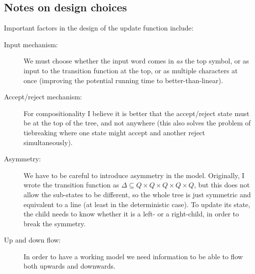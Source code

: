 \documentclass{article}
\theoremstyle{definition}
\begin{document}
\subsection{Notes on design choices}

Important factors in the design of the update function include:

\begin{description}
\item[Input mechanism:]
We must choose whether the input word comes in \emph{as} the top symbol, or as input to the transition function at the top, or as multiple characters at once (improving the potential running time to better-than-linear).

\item[Accept/reject mechanism:]
For compositionality I believe it is better that the accept/reject state must be at the top of the tree, and not anywhere (this also solves the problem of tiebreaking where one state might accept and another reject simultaneously).

\item[Asymmetry:]
We have to be careful to introduce asymmetry in the model.
Originally, I wrote the transition function as $\Delta \subseteq Q \times Q \times Q \times Q \times Q$, but this does not allow
the sub-states to be different, so the whole tree is just symmetric
and equivalent to a line (at least in the deterministic case).
To update its state, the child needs to know whether it is a left- or
a right-child, in order to break the symmetry.

\item[Up and down flow:]
In order to have a working model we need information to be able to flow both upwards and downwards.
\end{description}
\end{document}
